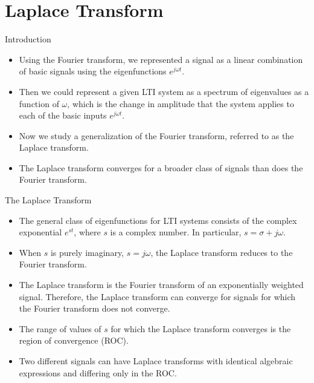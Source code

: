 \section{Laplace Transform}
\begin{frame}{Introduction}
    \begin{itemize}
        \item Using the Fourier transform, we represented a signal as a linear combination of basic signals using the eigenfunctions $e^{j\omega t}$.
        \item Then we could represent a given LTI system as a spectrum of eigenvalues as a function of $\omega$, which is the change in amplitude that the system applies to each of the basic inputs  $e^{j\omega t}$.
        \item Now we study a generalization of the Fourier transform, referred to as the Laplace transform.
        \item The Laplace transform converges for a broader class of signals than does the Fourier transform.
    \end{itemize}
\end{frame}


\begin{frame}{The Laplace Transform}
    \begin{itemize}
        \item The general class of eigenfunctions for LTI systems consists of the complex exponential $e^{st}$, where $s$ is a complex number.  In particular, $s=\sigma + j\omega$.
        \item When $s$ is purely imaginary, $s= j\omega$, the Laplace transform reduces to the Fourier transform.
        \item The Laplace transform is the Fourier transform of an exponentially weighted signal. Therefore, the Laplace transform can converge for signals for which the Fourier transform does not converge.
        \item The range of values of $s$  for which the Laplace transform converges is the \alert{region of convergence} (ROC).
        \item Two different signals can have Laplace transforms with identical algebraic expressions and differing only in the ROC.
    \end{itemize}
\end{frame}

